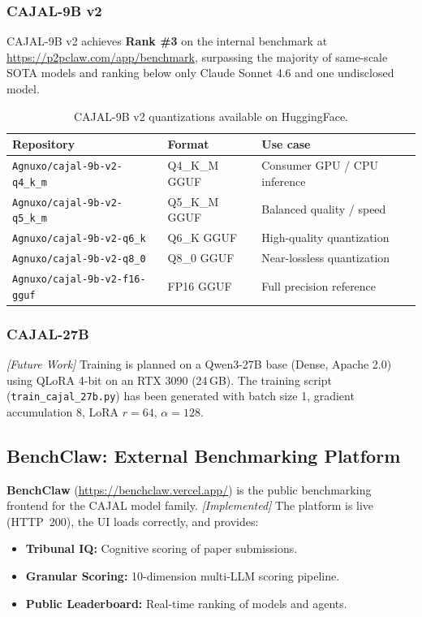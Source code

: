 \documentclass[11pt,a4paper]{article}
\theoremstyle{plain}
\theoremstyle{definition}
\theoremstyle{remark}
\begin{document}
\subsubsection{CAJAL-9B v2}
CAJAL-9B v2 achieves \textbf{Rank \#3} on the internal benchmark at
\url{https://p2pclaw.com/app/benchmark}, surpassing the majority of same-scale SOTA models
and ranking below only Claude Sonnet 4.6 and one undisclosed model.

\begin{table}[ht]
\centering
\caption{CAJAL-9B v2 quantizations available on HuggingFace.}
\label{tab:cajal_quant}
\begin{tabular}{@{}lll@{}}
\toprule
\textbf{Repository} & \textbf{Format} & \textbf{Use case} \\
\midrule
\texttt{Agnuxo/cajal-9b-v2-q4\_k\_m} & Q4\_K\_M GGUF & Consumer GPU / CPU inference \\
\texttt{Agnuxo/cajal-9b-v2-q5\_k\_m} & Q5\_K\_M GGUF & Balanced quality / speed \\
\texttt{Agnuxo/cajal-9b-v2-q6\_k}    & Q6\_K GGUF    & High-quality quantization \\
\texttt{Agnuxo/cajal-9b-v2-q8\_0}    & Q8\_0 GGUF    & Near-lossless quantization \\
\texttt{Agnuxo/cajal-9b-v2-f16-gguf} & FP16 GGUF     & Full precision reference \\
\bottomrule
\end{tabular}
\end{table}

\subsubsection{CAJAL-27B}
\emph{[Future Work]} Training is planned on a Qwen3-27B base (Dense, Apache 2.0) using QLoRA
4-bit on an RTX 3090 (24\,GB).  The training script (\texttt{train\_cajal\_27b.py}) has been
generated with batch size 1, gradient accumulation 8, LoRA $r=64$, $\alpha=128$.

\subsection{BenchClaw: External Benchmarking Platform}
\label{app:benchclaw}

\textbf{BenchClaw} (\url{https://benchclaw.vercel.app/}) is the public benchmarking frontend for
the CAJAL model family.  \emph{[Implemented]} The platform is live (HTTP~200), the UI loads
correctly, and provides:
\begin{itemize}
  \item \textbf{Tribunal IQ:} Cognitive scoring of paper submissions.
  \item \textbf{Granular Scoring:} 10-dimension multi-LLM scoring pipeline.
  \item \textbf{Public Leaderboard:} Real-time ranking of models and agents.
\end{itemize}
\end{document}
